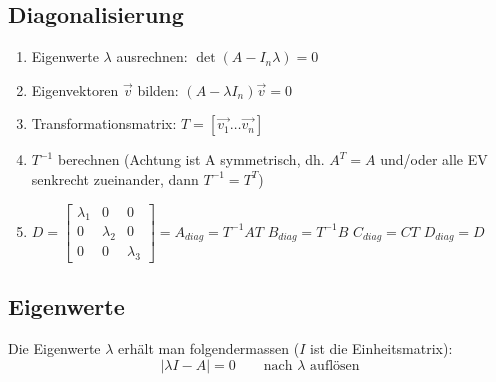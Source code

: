 \begin{multicols}{2}
 \subsection{Diagonalisierung}
 	\begin{enumerate}
       \item Eigenwerte $\lambda$ ausrechnen: $\det (A - I_n \lambda)=0$
       \item Eigenvektoren $\vec{v}$ bilden: $(A- \lambda I_n)\vec{v}=0$
       \item Transformationsmatrix: $T= [\vec{v_1} \ldots \vec{v_n}]$
       \item $T^{-1}$ berechnen (Achtung ist A symmetrisch, dh. $A^T=A$ und/oder alle EV senkrecht zueinander, dann $T^{-1}=T^T$)
       \item $D=\begin{bmatrix}
                	\lambda_1 &0 &0\\
                	0& \lambda_2 &0\\
                	0& 0& \lambda_3
                \end{bmatrix} = A_{diag} = T^{-1}AT$\newline
                $B_{diag} = T^{-1}B$\newline
                $C_{diag} = CT$\newline
                $D_{diag} = D$
     \end{enumerate}

\columnbreak
     
\subsection{Eigenwerte}
  Die Eigenwerte $\lambda$ erhält man folgendermassen ($I$ ist die Einheitsmatrix):
  \[ |\lambda I - A| = 0 \qquad \text{nach } \lambda \text{ auflösen} \]
\end{multicols}


